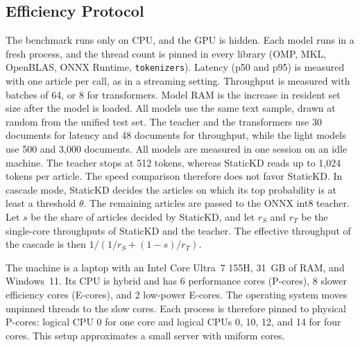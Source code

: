 \documentclass[journal]{IEEEtran}
\begin{document}
\subsection{Efficiency Protocol}
\label{sec:effprotocol}
The benchmark runs only on CPU, and the GPU is hidden. Each model runs in a fresh process, and the thread count is pinned in every library (OMP, MKL, OpenBLAS, ONNX Runtime, \texttt{tokenizers}). Latency (p50 and p95) is measured with one article per call, as in a streaming setting. Throughput is measured with batches of 64, or 8 for transformers. Model RAM is the increase in resident set size after the model is loaded. All models use the same text sample, drawn at random from the unified test set. The teacher and the transformers use 30 documents for latency and 48 documents for throughput, while the light models use 500 and 3,000 documents. All models are measured in one session on an idle machine. The teacher stops at 512 tokens, whereas StaticKD reads up to 1,024 tokens per article. The speed comparison therefore does not favor StaticKD. In cascade mode, StaticKD decides the articles on which its top probability is at least a threshold $\theta$. The remaining articles are passed to the ONNX int8 teacher. Let $s$ be the share of articles decided by StaticKD, and let $r_S$ and $r_T$ be the single-core throughputs of StaticKD and the teacher. The effective throughput of the cascade is then $1/(1/r_S+(1-s)/r_T)$.

The machine is a laptop with an Intel Core Ultra~7 155H, 31~GB of RAM, and Windows~11. Its CPU is hybrid and has 6 performance cores (P-cores), 8 slower efficiency cores (E-cores), and 2 low-power E-cores. The operating system moves unpinned threads to the slow cores. Each process is therefore pinned to physical P-cores: logical CPU 0 for one core and logical CPUs 0, 10, 12, and 14 for four cores. This setup approximates a small server with uniform cores.
\end{document}
